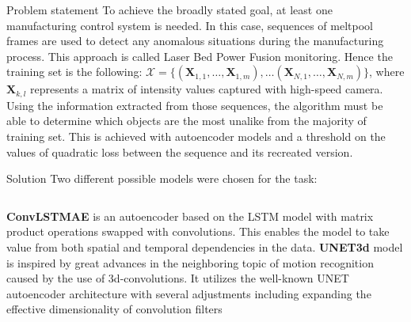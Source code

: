 \documentclass{beamer}
\begin{document}
\begin{frame}{Problem statement}
    To achieve the broadly stated goal, at least one manufacturing control system is needed. In this case, sequences of meltpool frames are used to detect any anomalous situations during the manufacturing process. This approach is called Laser Bed Power Fusion monitoring. Hence the training set is the following: $\mathbf{\mathcal{X}} = \{(\mathbf{X}_{1, 1}, \dots, \mathbf{X}_{1, m}), \dots (\mathbf{X}_{N, 1}, \dots, \mathbf{X}_{N, m})\}$, where $\mathbf{X}_{k, l}$ represents a matrix of intensity values captured with high-speed camera. Using the information extracted from those sequences, the algorithm must be able to determine which objects are the most unalike from the majority of training set. This is achieved with autoencoder models and a threshold on the values of quadratic loss between the sequence and its recreated version.
\end{frame}
\begin{frame}{Solution}
Two different possible models were chosen for the task:\vfill
\begin{columns}[c]
    \textbf{ConvLSTMAE} is an autoencoder based on the LSTM model with matrix product operations swapped with convolutions. This enables the model to take value from both spatial and temporal dependencies in the data.
    \textbf{UNET3d} model is inspired by great advances in the neighboring topic of motion recognition caused by the use of 3d-convolutions. It utilizes the well-known UNET autoencoder architecture with several adjustments including expanding the effective dimensionality of convolution filters
\end{columns}
\end{frame}
\end{document}
